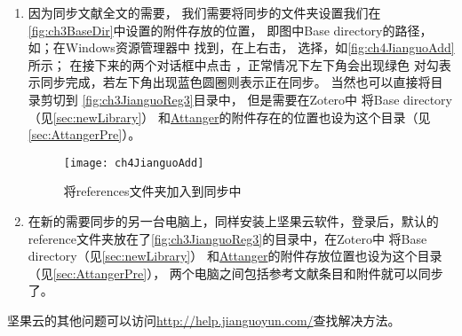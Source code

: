 \documentclass[theorem=false,mathfont=none,openany,sub3section]{easybook}
\begin{document}
\begin{enumerate}
\begin{figure}
	\end{figure}
	\item  因为同步文献全文的需要，
	我们需要将同步的文件夹设置我们在\autoref{fig:ch3BaseDir}中设置的附件存放的位置，
	即图中Base directory的路径，
	如；在Windows资源管理器中
	找到，在上右击，
	选择，如\autoref{fig:ch4JianguoAdd}所示；
	在接下来的两个对话框中点击
	，正常情况下左下角会出现绿色
	对勾表示同步完成，若左下角出现蓝色圆圈则表示正在同步。
	当然也可以直接将目录剪切到
	\autoref{fig:ch3JianguoReg3}目录中，
	但是需要在Zotero中
	将Base directory（见\cref{sec:newLibrary}）
	和\href{https://github.com/MuiseDestiny/zotero-attanger}{Attanger}的附件存在的位置也设为这个目录（见\cref{sec:AttangerPre}）。
	\begin{figure}[htbp]
		\centering
		\texttt{[image: ch4JianguoAdd]}
		\caption{将references文件夹加入到同步中}
		\label{fig:ch4JianguoAdd}
	\end{figure}
	\item 在新的需要同步的另一台电脑上，同样安装上坚果云软件，登录后，默认的
	reference文件夹放在了\autoref{fig:ch3JianguoReg3}的目录中，在Zotero中
	将Base directory（见\cref{sec:newLibrary}）
	和\href{https://github.com/MuiseDestiny/zotero-attanger}{Attanger}的附件存放位置也设为这个目录（见\cref{sec:AttangerPre}）， 
	两个电脑之间包括参考文献条目和附件就可以同步了。
	\end{enumerate}

坚果云的其他问题可以访问\url{http://help.jianguoyun.com/}查找解决方法。
\end{document}
